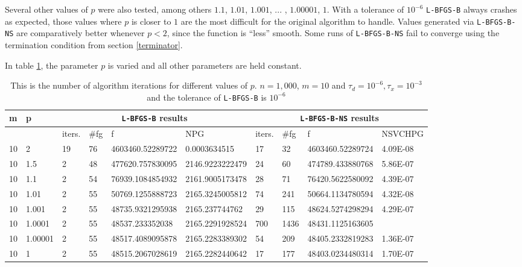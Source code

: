 Several other values of $p$ were also tested, among others $1.1$, $1.01$, $1.001$, ... , $1.00001$, $1$. With a tolerance of $10^{-6}$ \texttt{L-BFGS-B} always crashes as expected, those values where $p$ is closer to $1$ are the most difficult for the original algorithm to handle.  Values generated via \texttt{L-BFGS-B-NS} are comparatively better whenever $p < 2$, since the function is ``less'' smooth. Some runs of \texttt{L-BFGS-B-NS} fail to converge using the termination condition from section \ref{terminator}.

In table \ref{pmtable}, the parameter $p$ is varied and all other parameters are held constant.

\begin{table}
  \tiny
  \begin{center}
    \begin{tabular}{|l|l|l|l|l|l|l|l|l|l|}
      \hline
      m  &  p  & \multicolumn{4}{|c|}{\texttt{L-BFGS-B} results} & \multicolumn{4}{|c|}{\texttt{L-BFGS-B-NS} results} \\ \hline
      &  & iters. & \#fg & f & NPG & iters. & \#fg & f & NSVCHPG \\ \hline
      10 & 2 & 19 & 76 & 4603460.52289722 & 0.0003634515 & 17 & 32 & 4603460.52289724 & 4.09E-08\\
      10 & 1.5 & 2 & 48 & 477620.757830095 & 2146.9223222479 & 24 & 60 & 474789.433880768 & 5.86E-07\\
      10 & 1.1 & 2 & 54 & 76939.1084854932 & 2161.9005173478 & 28 & 71 & 76420.5622580092 & 4.39E-07\\
      10 & 1.01 & 2 & 55 & 50769.1255888723 & 2165.3245005812 & 74 & 241 & 50664.1134780594 & 4.32E-08\\
      10 & 1.001 & 2 & 55 & 48735.9321295938 & 2165.237744762 & 29 & 115 & 48624.5274298294 & 4.29E-07\\
      10 & 1.0001 & 2 & 55 & 48537.233352038 & 2165.2291928524 & 700 & 1436 & 48431.1125163605 & \\
      10 & 1.00001 & 2 & 55 & 48517.4089095878 & 2165.2283389302 & 54 & 209 & 48405.2332819283 & 1.36E-07\\
      10 & 1 & 2 & 55 & 48515.2067028619 & 2165.2282440642 & 17 & 177 & 48403.0234480314 & 1.70E-07\\
      \hline
    \end{tabular}
    \caption[Number of algorithm Iterations Changing $p$]{This is the number of algorithm iterations for different values of $p$. $n = 1,000$, $m = 10$ and $\tau_d = 10^{-6}, \tau_x = 10^{-3}$ and the tolerance of \texttt{L-BFGS-B} is $10^{-6}$ }
    \label{pmtable}
  \end{center}
\end{table}

